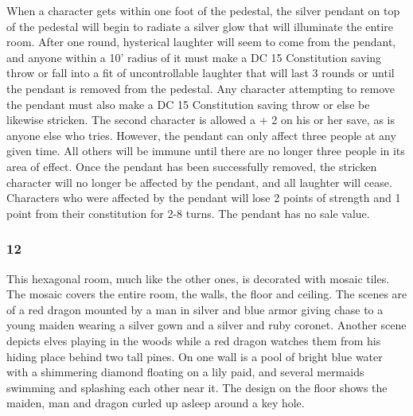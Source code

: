 \documentclass[palace_of_the_silver_princess]{subfiles}
\begin{document}
When a character gets within one foot of the pedestal, the silver
pendant on top of the pedestal will begin to radiate a silver glow that
will illuminate the entire room. After one round, hysterical laughter
will seem to come from the pendant, and anyone within a 10’ radius of it
must make a DC 15 Constitution saving throw or fall into a fit of
uncontrollable laughter that will last 3 rounds or until the pendant is
removed from the pedestal. Any character attempting to remove the
pendant must also make a DC 15 Constitution saving throw or else be
likewise stricken. The second character is allowed a + 2 on his or her
save, as is anyone else who tries. However, the pendant can only affect
three people at any given time. All others will be immune until there
are no longer three people in its area of effect. Once the pendant has
been successfully removed, the stricken character will no longer be
affected by the pendant, and all laughter will cease. Characters who
were affected by the pendant will lose 2 points of strength and 1 point
from their constitution for 2-8 turns. The pendant has no sale value.

\subsubsection{12}
\begin{quotebox}
    This hexagonal room, much like the other ones, is decorated with
    mosaic tiles. The mosaic covers the entire room, the walls, the
    floor and ceiling. The scenes are of a red dragon mounted by a man
    in silver and blue armor giving chase to a young maiden wearing a
    silver gown and a silver and ruby coronet. Another scene depicts
    elves playing in the woods while a red dragon watches them from his
    hiding place behind two tall pines. On one wall is a pool of bright
    blue water with a shimmering diamond floating on a lily paid, and
    several mermaids swimming and splashing each other near it. The
    design on the floor shows the maiden, man and dragon curled up
    asleep around a key hole.
\end{quotebox}
\end{document}
